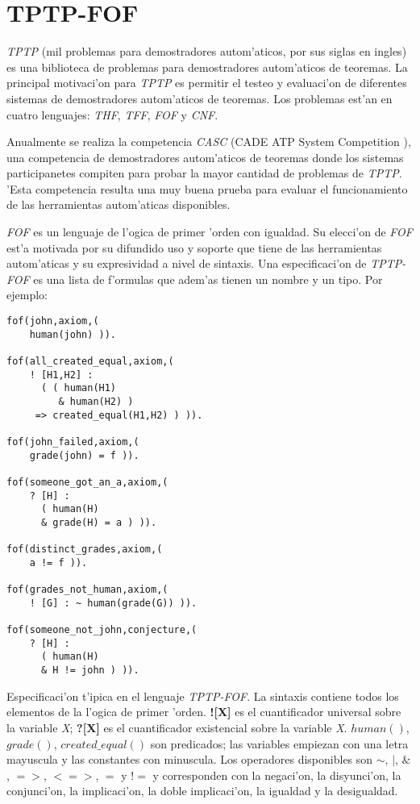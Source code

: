 \section{TPTP-FOF}

\textit{TPTP} (mil problemas para demostradores autom'aticos, por sus siglas en ingles) \cite{tptp} es una biblioteca de problemas para demostradores autom'aticos de teoremas. La principal motivaci'on para \textit{TPTP} es permitir el testeo y evaluaci'on de diferentes sistemas de demostradores autom'aticos de teoremas. Los problemas est'an en cuatro lenguajes: \textit{THF}, \textit{TFF}, \textit{FOF} y \textit{CNF}.

Anualmente se realiza la competencia \textit{CASC} (CADE ATP System Competition \cite{casc}), una competencia de demostradores autom'aticos de teoremas donde los sistemas participanetes compiten para probar la mayor cantidad de problemas de \textit{TPTP}. 'Esta competencia resulta una muy buena prueba para evaluar el funcionamiento de las herramientas autom'aticas disponibles.

\textit{FOF} \cite{fof} es un lenguaje de l'ogica de primer 'orden con igualdad. Su elecci'on de \textit{FOF} est'a motivada  por su difundido uso y soporte que tiene de las herramientas autom'aticas y su expresividad a nivel de sintaxis. Una especificaci'on de \textit{TPTP-FOF} es una lista de f'ormulas que adem'as tienen un nombre y un tipo. Por ejemplo:

\begin{verbatim}
fof(john,axiom,( 
    human(john) )).

fof(all_created_equal,axiom,( 
    ! [H1,H2] : 
      ( ( human(H1) 
         & human(H2) ) 
     => created_equal(H1,H2) ) )). 

fof(john_failed,axiom,( 
    grade(john) = f )). 

fof(someone_got_an_a,axiom,( 
    ? [H] : 
      ( human(H) 
      & grade(H) = a ) )). 

fof(distinct_grades,axiom,( 
    a != f )). 

fof(grades_not_human,axiom,( 
    ! [G] : ~ human(grade(G)) )). 

fof(someone_not_john,conjecture,( 
    ? [H] : 
      ( human(H) 
      & H != john ) )). 
\end{verbatim}

Especificaci'on t'ipica en el lenguaje \textit{TPTP-FOF}. La sintaxis contiene todos los elementos de la l'ogica de primer 'orden. \textbf{![X]} es el cuantificador universal sobre la variable \textit{X}; \textbf{?[X]} es el cuantificador existencial sobre la variable \textit{X}. \textit{$human()$}, \textit{$grade()$}, \textit{$created\_equal()$} son predicados; las variables empiezan con una letra mayuscula y las constantes con minuscula. Los operadores disponibles son $\sim$, $|$, $\&$, $=>$, $<=>$, $=$ y $!=$ y corresponden con la negaci'on, la disyunci'on, la conjunci'on, la implicaci'on, la doble implicaci'on, la igualdad y la desigualdad.

